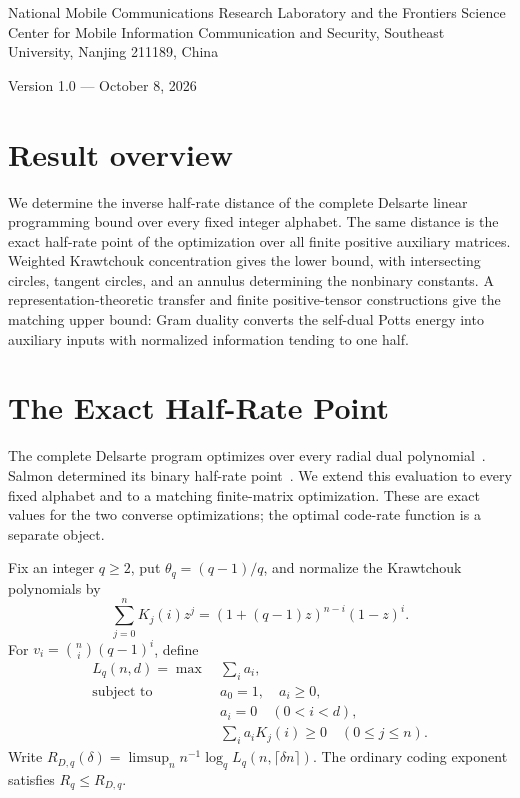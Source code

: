 \documentclass[12pt,letterpaper,onecolumn]{article}
\begin{document}
\par\medskip
{}\medskip
{}\par\smallskip
\noindent\begin{minipage}{\linewidth}\small National Mobile Communications Research Laboratory and the Frontiers Science Center for Mobile Information Communication and Security, Southeast University, Nanjing 211189, China\end{minipage}\par\medskip
\noindent Version 1.0 --- October 8, 2026\par\bigskip
{}
\section*{Result overview}
We determine the inverse half-rate distance of the complete Delsarte linear programming bound over every fixed integer alphabet. The same distance is the exact half-rate point of the optimization over all finite positive auxiliary matrices. Weighted Krawtchouk concentration gives the lower bound, with intersecting circles, tangent circles, and an annulus determining the nonbinary constants. A representation-theoretic transfer and finite positive-tensor constructions give the matching upper bound: Gram duality converts the self-dual Potts energy into auxiliary inputs with normalized information tending to one half.
\section{The Exact Half-Rate Point}
The complete Delsarte program optimizes over every radial dual polynomial~\cite{delsarte,macwilliams}. Salmon determined its binary half-rate point~\cite{salmon}. We extend this evaluation to every fixed alphabet and to a matching finite-matrix optimization. These are exact values for the two converse optimizations; the optimal code-rate function is a separate object.

Fix an integer $q\ge2$, put $\theta_q=(q-1)/q$, and normalize the Krawtchouk polynomials by
\begin{equation}\label{eq:kraw}
\sum_{j=0}^nK_j(i)z^j=(1+(q-1)z)^{n-i}(1-z)^i.
\end{equation}
For $v_i=\binom ni(q-1)^i$, define
\begin{equation}\label{eq:LP}
\begin{aligned}
L_q(n,d)=\max\ &\sum_i a_i,\\
\text{subject to }&a_0=1,\quad a_i\ge0,\\
&a_i=0\quad(0<i<d),\\
&\sum_i a_iK_j(i)\ge0\quad(0\le j\le n).
\end{aligned}
\end{equation}
Write $R_{D,q}(\delta)=\limsup_n n^{-1}\log_q L_q(n,\lceil\delta n\rceil)$. The ordinary coding exponent satisfies $R_q\le R_{D,q}$.
\end{document}
